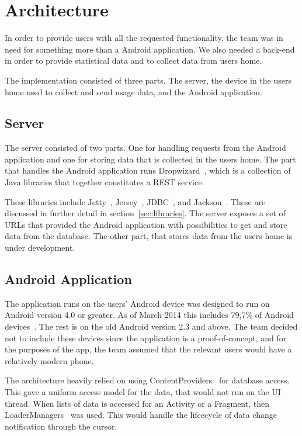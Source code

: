 \section{Architecture}
In order to provide users with all the requested functionality, the team was in need for something more than a Android application. We also needed a back-end in order to provide statistical data and to collect data from users home.

The implementation consisted of three parts. The server, the device in the users home used to collect and send usage data, and the Android application.

\subsection{Server}
The server consisted of two parts. One for handling requests from the Android application and one for storing data that is collected in the users home. 
The part that handles the Android application runs Dropwizard~\cite{dropwizard}, which is a collection of Java libraries that together constitutes a REST service. 

These libraries include Jetty~\cite{jetty}, Jersey~\cite{jersey}, JDBC~\cite{jdbc}, and Jackson~\cite{jackson}. These are discussed in further detail in section~\ref{sec:libraries}.
The server exposes a set of URLs that provided the Android application with 
possibilities to get and store data from the database. The other part, that stores data from the users home is under development.

\subsection{Android Application}
The application runs on the users' Android device was designed to run on Android version 4.0 or greater. As of March 2014 this includes 79,7\% of Android devices~\cite{AndroidDeviceFragmentation}. The rest is on the old Android version 2.3 and above. The team decided not to include these devices since the application is a proof-of-concept, and for the purposes of the app, the team assumed that the relevant users would have a relatively modern phone. 

The architecture heavily relied on using ContentProviders~\cite{contentproviders} for database access. This gave a uniform access model for the data, that would not run on the UI thread. When lists of data is accessed for an Activity or a Fragment, then LoaderManagers~\cite{loadermanager} was used. This would handle the lifcecycle of data change notification through the cursor. 


